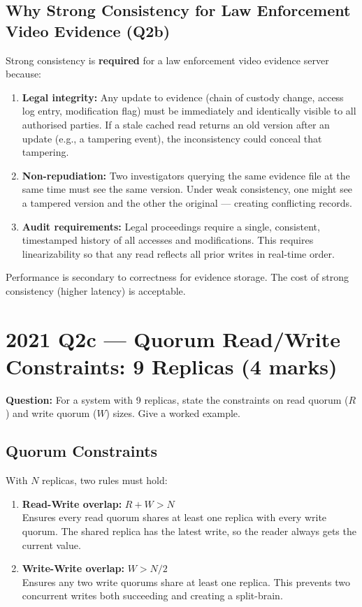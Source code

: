 \documentclass[12pt,a4paper]{article}
\begin{document}
\subsection*{Why Strong Consistency for Law Enforcement Video Evidence (Q2b)}

Strong consistency is \textbf{required} for a law enforcement video evidence server because:
\begin{enumerate}[noitemsep]
  \item \textbf{Legal integrity:} Any update to evidence (chain of custody change, access log entry, modification flag) must be immediately and identically visible to all authorised parties. If a stale cached read returns an old version after an update (e.g., a tampering event), the inconsistency could conceal that tampering.
  \item \textbf{Non-repudiation:} Two investigators querying the same evidence file at the same time must see the same version. Under weak consistency, one might see a tampered version and the other the original --- creating conflicting records.
  \item \textbf{Audit requirements:} Legal proceedings require a single, consistent, timestamped history of all accesses and modifications. This requires linearizability so that any read reflects all prior writes in real-time order.
\end{enumerate}
Performance is secondary to correctness for evidence storage. The cost of strong consistency (higher latency) is acceptable.

\section{2021 Q2c --- Quorum Read/Write Constraints: 9 Replicas (4 marks)}

\textbf{Question:} For a system with 9 replicas, state the constraints on read quorum ($R$) and write quorum ($W$) sizes. Give a worked example.

\subsection*{Quorum Constraints}

With $N$ replicas, two rules must hold:

\begin{enumerate}
  \item \textbf{Read-Write overlap:} $R + W > N$\\
    Ensures every read quorum shares at least one replica with every write quorum. The shared replica has the latest write, so the reader always gets the current value.

  \item \textbf{Write-Write overlap:} $W > N/2$\\
    Ensures any two write quorums share at least one replica. This prevents two concurrent writes both succeeding and creating a split-brain.
\end{enumerate}
\end{document}
